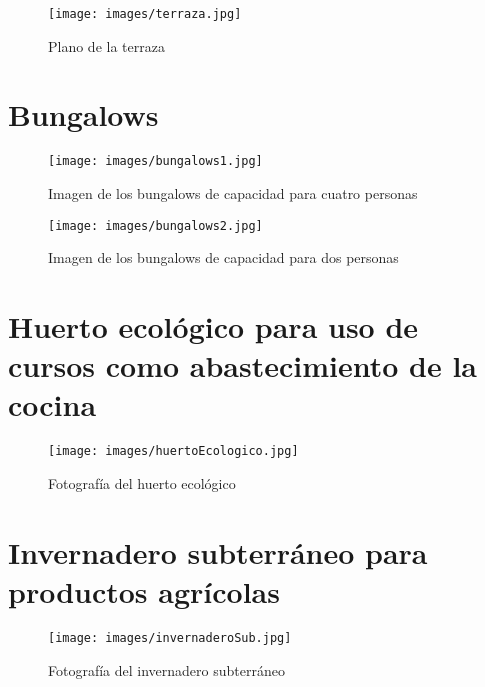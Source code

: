 \begin{figure}[h]
  \begin{center}
    \texttt{[image: images/terraza.jpg]}
    \caption{Plano de la terraza}
    \label{fig:terraza}
  \end{center}
\end{figure}

\newpage
\section{Bungalows}
\label{sec:bungalows}

\begin{figure}[h]
  \begin{center}
    \texttt{[image: images/bungalows1.jpg]}
    \caption{Imagen de los bungalows de capacidad para cuatro personas}
    \label{fig:bungalows1}
  \end{center}
\end{figure}

\begin{figure}[h]
  \begin{center}
    \texttt{[image: images/bungalows2.jpg]}
    \caption{Imagen de los bungalows de capacidad para dos personas}
    \label{fig:bungalows2}
  \end{center}
\end{figure}

\newpage
\section{Huerto ecológico para uso de cursos como abastecimiento de la cocina}
\label{sec:huerto}


\begin{figure}[h]
  \begin{center}
    \texttt{[image: images/huertoEcologico.jpg]}
    \caption{Fotografía del huerto ecológico}
    \label{fig:huertoEcologico}
  \end{center}
\end{figure}

\section{Invernadero subterráneo para productos agrícolas}
\label{sec:invSubterraneo}

\begin{figure}[h]
  \begin{center}
    \texttt{[image: images/invernaderoSub.jpg]}
    \caption{Fotografía del invernadero subterráneo}
    \label{fig:invernaderSub}
  \end{center}
\end{figure}


